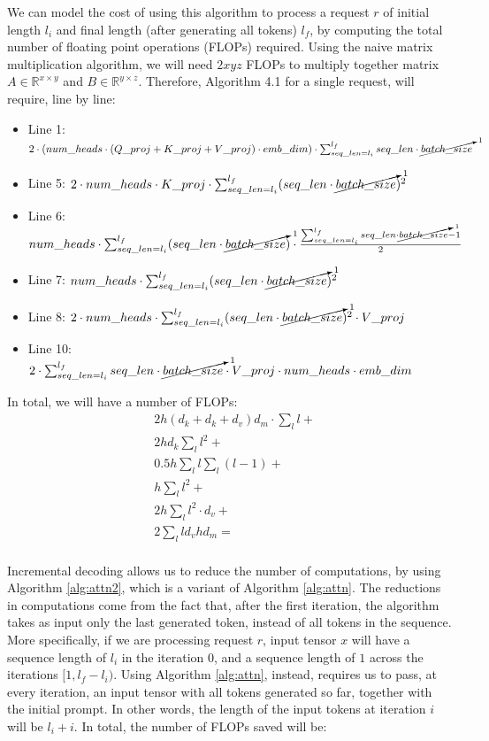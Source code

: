 We can model the cost of using this algorithm to process a request $r$ of initial length $l_i$ and final length (after generating all tokens) $l_f$, by computing the total number of floating point operations (FLOPs) required. Using the naive matrix multiplication algorithm, we will need $2xyz$ FLOPs to multiply together matrix $A\in \mathbb{R}^{x \times y}$ and $B\in \mathbb{R}^{y \times z}$. Therefore, Algorithm 4.1 for a single request, will require, line by line:
\begin{itemize}
    \item Line 1: $2 \cdot (num\_heads \cdot (Q\_proj + K\_proj + V\_proj) \cdot emb\_dim ) \cdot \sum_{seq\_len=l_i}^{l_f} seq\_len \cdot \cancelto{1}{batch\_size} $
    \item Line 5: $2 \cdot num\_heads \cdot K\_proj \cdot \sum_{seq\_len=l_i}^{l_f} (seq\_len \cdot \cancelto{1}{batch\_size})^2 $
    \item Line 6: $num\_heads \cdot \sum_{seq\_len=l_i}^{l_f} (seq\_len \cdot \cancelto{1}{batch\_size}) \cdot \frac{\sum_{seq\_len=l_i}^{l_f} seq\_len \cdot \cancelto{1}{batch\_size} - 1}{2}$
    \item Line 7: $num\_heads \cdot \sum_{seq\_len=l_i}^{l_f} (seq\_len \cdot \cancelto{1}{batch\_size})^2$
    \item Line 8: $2 \cdot num\_heads \cdot \sum_{seq\_len=l_i}^{l_f} (seq\_len \cdot \cancelto{1}{batch\_size})^2 \cdot V\_proj$
    \item Line 10: $2 \cdot \sum_{seq\_len=l_i}^{l_f} seq\_len \cdot \cancelto{1}{batch\_size} \cdot V\_proj \cdot num\_heads \cdot emb\_dim$ 
\end{itemize}

In total, we will have a number of FLOPs:
\begin{align}
    & 2 h (d_k + d_k + d_v) d_m \cdot \sum_{l} l + \\
    & 2 h d_k \sum_{l} l^2 + \\
    & 0.5 h \sum_{l} l \sum_{l} (l-1) + \\
    & h \sum_{l} l^2 + \\
    & 2h \sum_{l} l^2 \cdot d_v + \\
    & 2\sum_{l} l d_v h d_m = \\
\end{align}

Incremental decoding allows us to reduce the number of computations, by using Algorithm \ref{alg:attn2}, which is a variant of Algorithm \ref{alg:attn}. The reductions in computations come from the fact that, after the first iteration, the algorithm takes as input only the last generated token, instead of all tokens in the sequence. More specifically, if we are processing request $r$, input tensor $x$ will have a sequence length of $l_i$ in the iteration 0, and a sequence length of $1$ across the iterations $[1, l_f - l_i)$. Using Algorithm \ref{alg:attn}, instead, requires us to pass, at every iteration, an input tensor with all tokens generated so far, together with the initial prompt. In other words, the length of the input tokens at iteration $i$ will be $l_i + i$. In total, the number of FLOPs saved will be:


